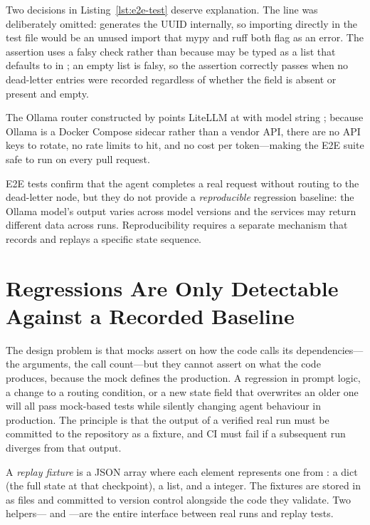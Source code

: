 Two decisions in Listing~\ref{lst:e2e-test} deserve explanation.
The  line was deliberately omitted: 
generates the  UUID internally, so importing 
directly in the test file would be an unused import that mypy and ruff
both flag as an error.
The assertion  uses a falsy
check rather than  because  may be
typed as a list that defaults to \code{[]} in ; an
empty list is falsy, so the assertion correctly passes when no
dead-letter entries were recorded regardless of whether the field is
absent or present and empty.

The Ollama router constructed by  points
LiteLLM at  with model string
; because Ollama is a Docker Compose
sidecar rather than a vendor API, there are no API keys to rotate, no
rate limits to hit, and no cost per token---making the E2E suite safe to
run on every pull request.

E2E tests confirm that the agent completes a real request without
routing to the dead-letter node, but they do not provide a
\emph{reproducible} regression baseline: the Ollama model's output
varies across model versions and the services may return different data
across runs.
Reproducibility requires a separate mechanism that records and replays
a specific state sequence.

\section{Regressions Are Only Detectable Against a Recorded Baseline}
\label{sec:replay-fixtures}

The design problem is that mocks assert on how the code calls its
dependencies---the arguments, the call count---but they cannot assert
on what the code produces, because the mock defines the production.
A regression in prompt logic, a change to a routing condition, or a
new state field that overwrites an older one will all pass mock-based
tests while silently changing agent behaviour in production.
The principle is that the output of a verified real run must be
committed to the repository as a fixture, and CI must fail if a
subsequent run diverges from that output.

A \emph{replay fixture} is a JSON array where each element represents
one  from : a 
dict (the full state at that checkpoint), a  list, and
a  integer.
The fixtures are stored in  as
 files and committed to version control alongside
the code they validate.
Two helpers--- and ---are the
entire interface between real runs and replay tests.

